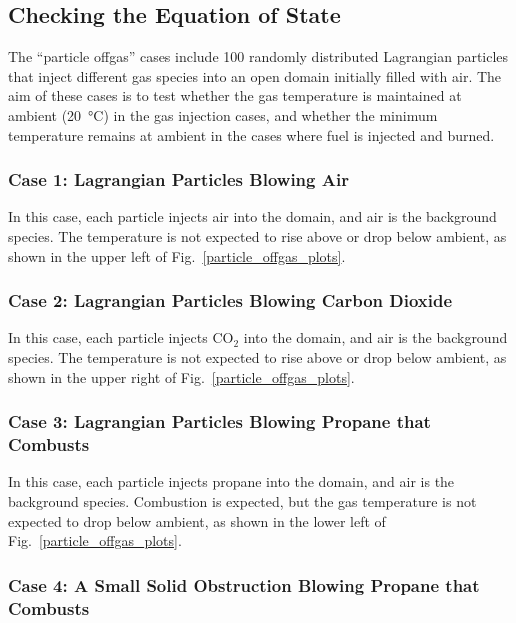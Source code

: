 \documentclass[11pt]{book}
\begin{document}
\subsection{Checking the Equation of State}
\label{particle_offgas_1}
\label{particle_offgas_2}
\label{particle_offgas_3}
\label{particle_offgas_4}

The ``particle offgas'' cases include 100 randomly distributed Lagrangian particles that inject different gas species into an open domain initially filled with air. The aim of these cases is to test whether the gas temperature is maintained at ambient (20~\unit{\degreeCelsius}) in the gas injection cases, and whether the minimum temperature remains at ambient in the cases where fuel is injected and burned.

\subsubsection{Case 1: Lagrangian Particles Blowing Air}

In this case, each particle injects air into the domain, and air is the background species. The temperature is not expected to rise above or drop below ambient, as shown in the upper left of Fig.~\ref{particle_offgas_plots}.

\subsubsection{Case 2: Lagrangian Particles Blowing Carbon Dioxide}

In this case, each particle injects CO$_2$ into the domain, and air is the background species. The temperature is not expected to rise above or drop below ambient, as shown in the upper right of Fig.~\ref{particle_offgas_plots}.

\subsubsection{Case 3: Lagrangian Particles Blowing Propane that Combusts}

In this case, each particle injects propane into the domain, and air is the background species. Combustion is expected, but the gas temperature is not expected to drop below ambient, as shown in the lower left of Fig.~\ref{particle_offgas_plots}.

\subsubsection{Case 4: A Small Solid Obstruction Blowing Propane that Combusts}
\end{document}
